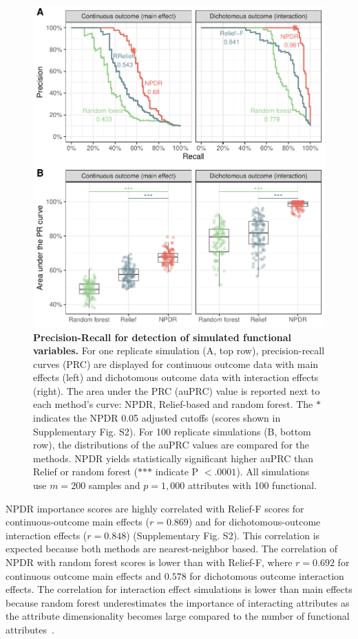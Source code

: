 \documentclass{bioinfo}
\begin{document}
\begin{figure}[H]
\centerline{\includegraphics[trim = 0 0 0 0, scale = 0.55, clip]{../../figs/pr_compare_100.pdf}}
\caption{{\bf Precision-Recall for detection of simulated functional variables.} For one replicate simulation (A, top row), precision-recall curves (PRC) are displayed for continuous outcome data with main effects (left) and dichotomous outcome data with interaction effects (right). The area under the PRC (auPRC) value is reported next to each method's curve: NPDR, Relief-based and random forest. The $\ast$ indicates the NPDR 0.05 adjusted cutoffs (scores shown in Supplementary Fig. S2). For 100 replicate simulations (B, bottom row), the distributions of the auPRC values are compared for the methods. NPDR yields statistically significant higher auPRC than Relief or random forest ($\ast$$\ast$$\ast$ indicate P $<.0001$). All simulations use $m = 200$ samples and $p = 1,000$ attributes with 100 functional.}
\label{fig:pr_curve}
\end{figure}

NPDR importance scores are highly correlated with Relief-F scores for continuous-outcome main effects ($r = 0.869$) and for dichotomous-outcome interaction effects ($r=0.848$) (Supplementary Fig. S2).
This correlation is expected because both methods are nearest-neighbor based.
The correlation of NPDR with random forest scores is lower than with Relief-F, where $r = 0.692$ for continuous outcome main effects and $0.578$ for dichotomous outcome interaction effects.
The correlation for interaction effect simulations is lower than main effects because random forest underestimates the importance of interacting attributes as the attribute dimensionality becomes large compared to the number of functional attributes~\citep{mckinney2009capturing,winham2012snp}.
\end{document}
